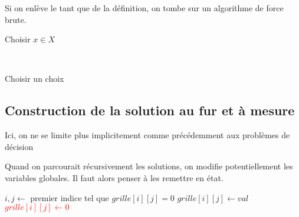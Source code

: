 \begin{rem}
	Si on enlève le tant que de la définition, on tombe sur un algorithme de force brute.
\end{rem}

\begin{algorithm}
	\caption{$SSE(X, S)$}
	Choisir $x \in X$\\
\end{algorithm}

\begin{principe}
	\enspace\\
	\begin{algorithm}[H]
		\caption{$RST(n)$}
			{}
			{}
		Choisir un choix\\
		{
			{
			}
		}
	\end{algorithm}
\end{principe}

\subsection{Construction de la solution au fur et à mesure}

\begin{com}
	Ici, on ne se limite plus implicitement comme précédemment aux problèmes de décision
\end{com}

\begin{rem}
	Quand on parcourait récursivement les solutions, on modifie potentiellement les variables globales. Il faut alors penser à les remettre en état.
\end{rem}

\begin{algorithm}
	\caption{$Sudoku(grille)$}
	{
	}
	$i,j \gets$ premier indice tel que $grille[i][j] = 0$
	{
		{
			$grille[i][j] \gets val$\\
			{
			}
		}
	}
	\textcolor{red}{$grille[i][j] \gets 0$} \quad {}
\end{algorithm}

